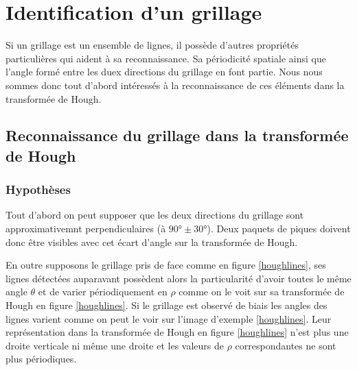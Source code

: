 \section{Identification d'un grillage}
Si un grillage est un ensemble de lignes, il possède d'autres propriétés particulières qui aident à sa reconnaissance. Sa périodicité spatiale ainsi que l'angle formé entre les duex directions du grillage en font partie. Nous nous sommes donc tout d'abord intéressés à la reconnaissance de ces éléments dans la transformée de Hough. 

\subsection{Reconnaissance du grillage dans la transformée de Hough}
\subsubsection{Hypothèses}
Tout d'abord on peut supposer que les deux directions du grillage sont approximativemnt perpendiculaires (à $90\text{°} \pm 30\text{°}$). Deux paquets de piques doivent donc être visibles avec cet écart d'angle sur la transformée de Hough.

En outre supposons le grillage pris de face comme en figure  \ref{houghlines}, ses lignes  détectées auparavant possèdent alors la particularité d'avoir toutes le même angle $\theta$ et de varier périodiquement en $\rho$ comme on le voit sur sa transformée de Hough en figure \ref{houghlines}. Si le grillage est observé de biais les angles des lignes varient comme on peut le voir sur l'image d'exemple \ref{houghlines}. Leur représentation dans la transformée de Hough en figure \ref{houghlines} n'est plus une droite verticale ni même une droite et les valeurs de $\rho$ correspondantes ne sont plus périodiques.

